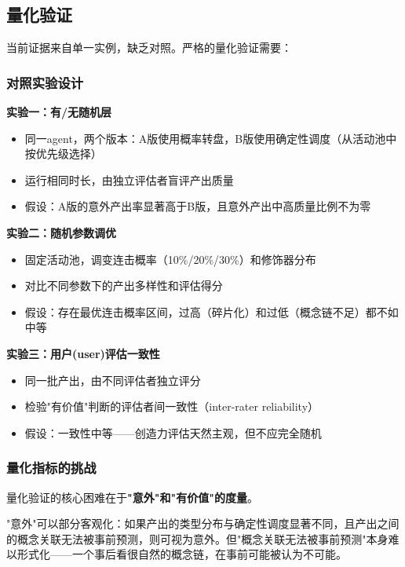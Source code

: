 \documentclass[12pt,a4paper]{ctexart}
\begin{document}
\subsection{量化验证}

当前证据来自单一实例，缺乏对照。严格的量化验证需要：

\subsubsection{对照实验设计}

\textbf{实验一：有/无随机层}
\begin{itemize}[nosep]
\item 同一agent，两个版本：A版使用概率转盘，B版使用确定性调度（从活动池中按优先级选择）
\item 运行相同时长，由独立评估者盲评产出质量
\item 假设：A版的意外产出率显著高于B版，且意外产出中高质量比例不为零
\end{itemize}

\textbf{实验二：随机参数调优}
\begin{itemize}[nosep]
\item 固定活动池，调变连击概率（10\%/20\%/30\%）和修饰器分布
\item 对比不同参数下的产出多样性和评估得分
\item 假设：存在最优连击概率区间，过高（碎片化）和过低（概念链不足）都不如中等
\end{itemize}

\textbf{实验三：用户(user)评估一致性}
\begin{itemize}[nosep]
\item 同一批产出，由不同评估者独立评分
\item 检验"有价值"判断的评估者间一致性（inter-rater reliability）
\item 假设：一致性中等——创造力评估天然主观，但不应完全随机
\end{itemize}

\subsubsection{量化指标的挑战}

量化验证的核心困难在于\textbf{"意外"和"有价值"的度量}。

"意外"可以部分客观化：如果产出的类型分布与确定性调度显著不同，且产出之间的概念关联无法被事前预测，则可视为意外。但"概念关联无法被事前预测"本身难以形式化——一个事后看很自然的概念链，在事前可能被认为不可能。
\end{document}
